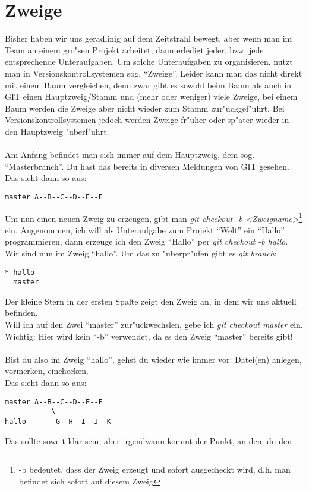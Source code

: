 \documentclass[german,a4paper]{report}
\begin{document}
\chapter{Zweige}
Bisher haben wir uns geradlinig auf dem Zeitstrahl bewegt, aber wenn man im Team an
einem gro"sen Projekt arbeitet, dann erledigt jeder, bzw. jede entsprechende Unteraufgaben.
Um solche Unteraufgaben zu organisieren, nutzt man in Versionskontrollsystemen sog.
``Zweige''. Leider kann man das nicht direkt mit einem Baum vergleichen, denn zwar
gibt es sowohl beim Baum als auch in GIT einen Hauptzweig/Stamm und (mehr oder weniger)
viele Zweige, bei einem Baum werden die Zweige aber nicht wieder zum Stamm zur"uckgef"uhrt.
Bei Versionskontrollsystemen jedoch werden Zweige fr"uher oder sp"ater wieder in den Hauptzweig
"uberf"uhrt.\\
\\
Am Anfang befindet man sich immer auf dem Hauptzweig, dem sog. ``Masterbranch''. Du hast das
bereits in diversen Meldungen von GIT gesehen.\\
Das sieht dann so aus:
\begin{verbatim}
master A--B--C--D--E--F
\end{verbatim}
Um nun einen neuen Zweig zu erzeugen, gibt man
\textit{git checkout -b <Zweigname>}\footnote{-b bedeutet, dass der Zweig erzeugt und sofort
ausgecheckt wird, d.h. man befindet sich sofort auf diesem Zweig} ein.
Angenommen, ich will als Unteraufgabe zum Projekt ``Welt'' ein ``Hallo'' programmieren,
dann erzeuge ich den Zweig ``Hallo'' per \textit{git checkout -b hallo}. Wir sind nun im Zweig
``hallo''. Um das zu "uberpr"ufen gibt es \textit{git branch}:
\begin{verbatim}
* hallo
  master
\end{verbatim}
Der kleine Stern in der ersten Spalte zeigt den Zweig an, in dem wir uns aktuell befinden.\\
Will ich auf den Zwei ``master'' zur"uckwechslen, gebe ich \textit{git checkout master} ein.
Wichtig: Hier wird kein ``-b'' verwendet, da es den Zweig ``master'' bereits gibt!\\
\\
Bist du also im Zweig ``hallo'', gehst du wieder wie immer vor: Datei(en) anlegen, vormerken,
einchecken.\\
Das sieht dann so aus:
\begin{verbatim}
master A--B--C--D--E--F
           \
hallo       G--H--I--J--K
\end{verbatim}
Das sollte soweit klar sein, aber irgendwann kommt der Punkt, an dem du den
\end{document}
